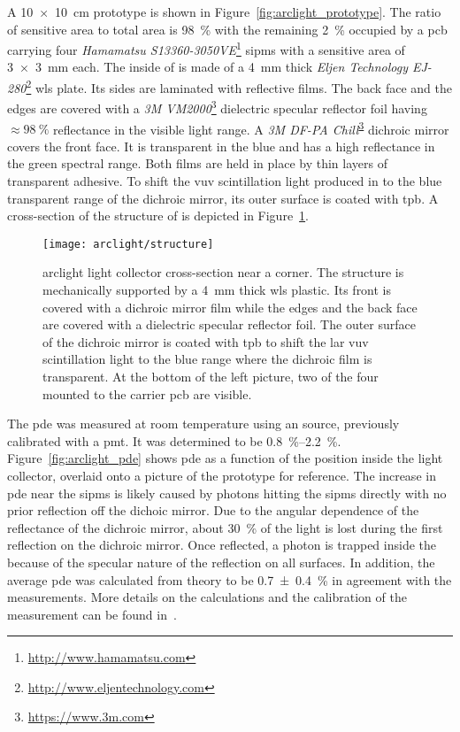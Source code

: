A \SI{10 x 10}{\centi\metre} \AL{} prototype is shown in Figure~\ref{fig:arclight_prototype}.
The ratio of sensitive area to total area is \SI{98}{\percent} with the remaining \SI{2}{\percent} occupied by a \gls{pcb} carrying four \emph{Hamamatsu S13360-3050VE}\footnote{\url{http://www.hamamatsu.com}} \glspl{sipm} with a sensitive area of \SI{3 x 3}{\milli\metre} each.
The inside of \AL{} is made of a \SI{4}{\milli\metre} thick \emph{Eljen Technology EJ-280}\footnote{\url{http://www.eljentechnology.com}} \gls{wls} plate.
Its sides are laminated with reflective films.
The back face and the edges are covered with a \emph{3M VM2000}\footnote{\url{https://www.3m.com}\label{foot:3M}} dielectric specular reflector foil having $\approx \SI{98}{\percent}$ reflectance in the visible light range.
A \emph{3M DF-PA Chill}\textsuperscript{\ref{foot:3M}} dichroic mirror covers the front face.
It is transparent in the blue and has a high reflectance in the green spectral range.
Both films are held in place by thin layers of transparent adhesive.
To shift the \gls{vuv} scintillation light produced in \lar{} to the blue transparent range of the dichroic mirror, its outer surface is coated with \gls{tpb}.
A cross-section of the structure of \AL{} is depicted in Figure~\ref{fig:arclight_structure}.

\begin{figure}[htb]
	\centering
	\texttt{[image: arclight/structure]}
	\caption[ light collector cross-section]{%
		\acrshort{arclight} light collector cross-section near a corner.
		The structure is mechanically supported by a \SI{4}{\milli\metre} thick \acrshort{wls} plastic.
		Its front is covered with a dichroic mirror film while the edges and the back face are covered with a dielectric specular reflector foil.
		The outer surface of the dichroic mirror is coated with \acrshort{tpb} to shift the \acrshort{lar} \acrshort{vuv} scintillation light to the blue range where the dichroic film is transparent.
		At the bottom of the left picture, two of the four  mounted to the carrier \acrshort{pcb} are visible.
	}
	\label{fig:arclight_structure}
\end{figure}

The \gls{pde} was measured at room temperature using an  source, previously calibrated with a \gls{pmt}.
It was determined to be \SIrange{0.8}{2.2}{\percent}.
Figure~\ref{fig:arclight_pde} shows \gls{pde} as a function of the position inside the light collector, overlaid onto a picture of the prototype for reference.
The increase in \gls{pde} near the \glspl{sipm} is likely caused by photons hitting the \glspl{sipm} directly with no prior reflection off the dichoic mirror.
Due to the angular dependence of the reflectance of the dichroic mirror, about \SI{30}{\percent} of the light is lost during the first reflection on the dichroic mirror.
Once reflected, a photon is trapped inside the \AL{} because of the specular nature of the reflection on all surfaces.
In addition, the average \gls{pde} was calculated from theory to be \SI{0.7 +- 0.4}{\percent} in agreement with the measurements.
More details on the calculations and the calibration of the measurement can be found in~\cite{arclight}.

